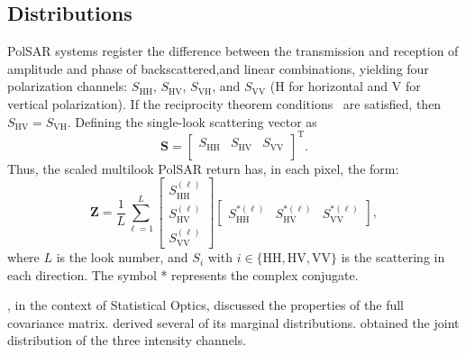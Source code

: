 \documentclass[remotesensing,article,submit,pdftex,moreauthors]{Definitions/mdpi}
\begin{document}
\subsection{Distributions}
PolSAR systems register  the difference between the transmission and reception of amplitude and phase of backscattered,and  linear combinations, 
yielding four polarization channels:  $S_\text{HH}$, $S_\text{HV}$, $S_\text{VH}$, and $S_\text{VV}$  
(H for horizontal and V for vertical polarization).
%
If the reciprocity theorem conditions~\cite{MicrowaveRadarRadiometricRemoteSensing} are satisfied, then 
$S_\text{HV}=S_\text{VH}$.
%
Defining the single-look scattering vector as
\begin{equation}\label{vetor_lexicografico_3d}
\mathbf{S}=\left[
	\begin{array}{ccc}
	S_\text{HH}& S_\text{HV}& S_\text{VV}\\
\end{array}\right]^\text{T}.
\end{equation}
Thus, the scaled multilook PolSAR return has, in each pixel, the form:
$$
\bm{Z}
=
\frac{1}{L}
\sum_{\ell=1}^L
\begin{bmatrix}
S_{\text{HH}}^{(\ell)}\\
S_{\text{HV}}^{(\ell)}\\
S_{\text{VV}}^{(\ell)}
\end{bmatrix}
%
\begin{bmatrix}{S_{\text{HH}}^{*(\ell)}} &{S_{\text{HV}}^{*(\ell)}} &{S_{\text{VV}}^{*(\ell)}}
\end{bmatrix}
,
$$
where $L$ is the look number, and $S_i$ with $i\in \{\text{HH}, \text{HV}, \text{VV}\}$ is the scattering in each direction. The symbol * represents the complex conjugate.

\citet{StatisticalAnalysisBasedonaCertainComplexGaussianDistributionanIntroduction}, in the context of Statistical Optics, discussed the properties of the full covariance matrix.
\citet{IntensityandPhaseStatisticsofMultilookPolarimetricandInterferometricSARImagery} derived several of its marginal distributions.
\citet{ATrivariateChiSquaredDistributionDerivedfromtheComplexWishartDistribution} obtained the joint distribution of the three intensity channels.
\end{document}
